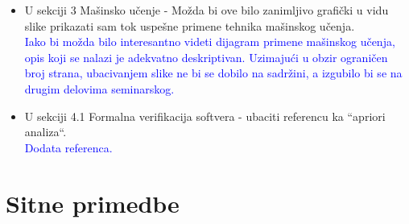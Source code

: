 \documentclass[a4paper]{report}
\newcommand{\odgovor}[1]{\textcolor{blue}{#1}}
\begin{document}
\begin{itemize}
  \item U sekciji 3 Mašinsko učenje - Možda bi ove bilo zanimljivo grafički u vidu slike prikazati sam tok uspešne primene tehnika mašinskog učenja.
  \\\odgovor{Iako bi možda bilo interesantno videti dijagram primene mašinskog učenja, opis koji se nalazi je adekvatno deskriptivan. Uzimajući u obzir ograničen broj strana, ubacivanjem slike ne bi se dobilo na sadržini, a izgubilo bi se na drugim delovima seminarskog.}


  \item U sekciji 4.1 Formalna verifikacija softvera - ubaciti referencu ka ``apriori analiza``.
  \\\odgovor{Dodata referenca.}

\end{itemize}
\section{Sitne primedbe}
\end{document}
